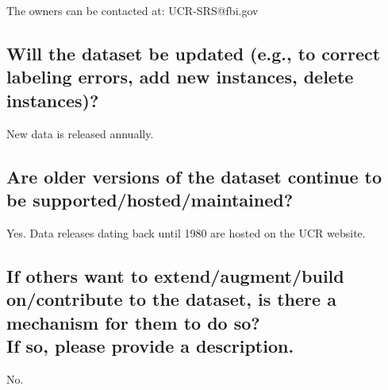 \documentclass[letterpaper, 10 pt, conference]{ieeeconf}  %
\newcommand{\subtitle}[1]{{\\ \small \normalfont \color{purple} #1}}
\begin{document}
The owners can be contacted at: UCR-SRS@fbi.gov

\subsection{Will the dataset be updated (e.g., to correct labeling errors, add new instances, delete instances)?}

New data is released annually. 

\subsection{Are older versions of the dataset continue to be supported/hosted/maintained?}

Yes. Data releases dating back until 1980 are hosted on the UCR website.

\subsection{If others want to extend/augment/build on/contribute to the dataset, is there a mechanism for them to do so? \subtitle{If so, please provide a description.}}

No.

\medskip
 
  

\end{document}
